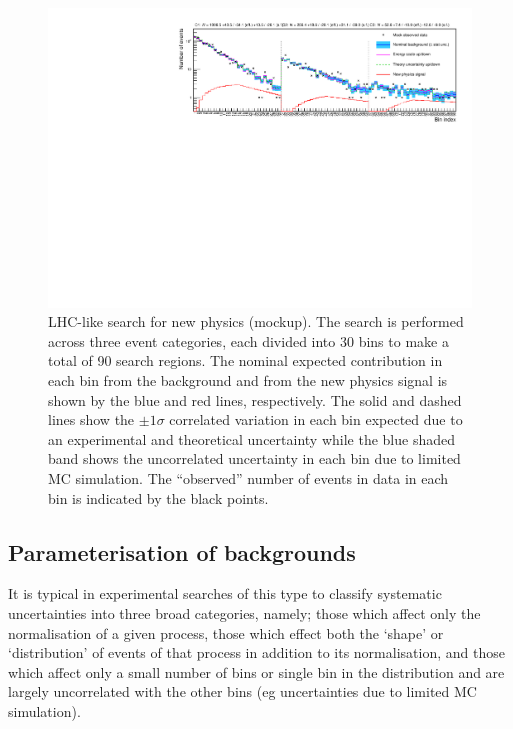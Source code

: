 \documentclass[11pt]{article}
\begin{document}
\begin{figure}
\begin{center}
\includegraphics[width=\textwidth]{figures/t}
\end{center}
\caption{LHC-like search for new physics (mockup). The search is performed across three event categories, each divided into 30 bins to make a total of 90 search regions. The nominal expected contribution in each bin from the
background and from the new physics signal is shown by the blue and red lines, respectively. The solid and dashed lines show the $\pm1\sigma$ correlated variation in each bin expected due to an experimental and theoretical
uncertainty while the blue shaded band shows the uncorrelated uncertainty in each bin due to limited MC simulation. The ``observed'' number of events in data in each bin is indicated by the black points.}
\label{fig:toy}
\end{figure}



\subsection{Parameterisation of backgrounds}

It is typical in experimental searches of this type to classify systematic uncertainties into three broad categories, namely; those which affect only the normalisation of a given process, those which effect both the
`shape' or `distribution' of events of that process in addition to its normalisation, and those which affect only a small number of bins or single bin in the distribution and are largely uncorrelated with the other
bins (eg uncertainties due to limited MC simulation).
\end{document}
